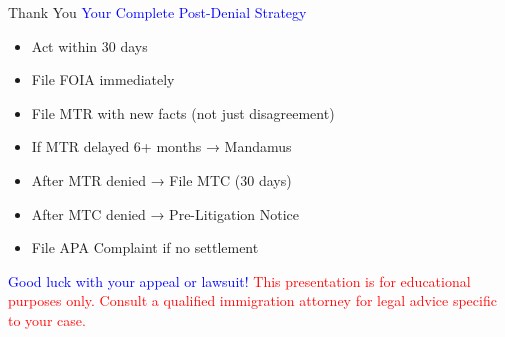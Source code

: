 \documentclass[11pt]{beamer}
\begin{document}
	\begin{frame}{Thank You}
		\centering
		\vspace{1cm}
		\textcolor{blue}{\Large Your Complete Post-Denial Strategy}
		\vspace{0.5cm}
		\begin{itemize}
			\item Act within 30 days
			\item File FOIA immediately
			\item File MTR with new facts (not just disagreement)
			\item If MTR delayed 6+ months → Mandamus
			\item After MTR denied → File MTC (30 days)
			\item After MTC denied → Pre-Litigation Notice
			\item File APA Complaint if no settlement
		\end{itemize}
		\vspace{0.5cm}
		\textcolor{blue}{\Large Good luck with your appeal or lawsuit!}
		\vspace{0.5cm}
		\textcolor{red}{This presentation is for educational purposes only. Consult a qualified immigration attorney for legal advice specific to your case.}
	\end{frame}
	
\end{document}
